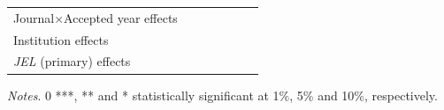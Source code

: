 \begin{table}
\begin{threeparttable}
\begin{tabular}{p{3.78cm}S@{}S@{}S@{}S@{}S@{}S@{}}
            Journal\(\times\)Accepted year effects &               &               &           {}   &               &               &           {}   \\
            Institution effects           &           {}   &           {}   &           {}   &           {}   &           {}   &           {}   \\
            \textit{JEL} (primary) effects&               &               &               &           {}   &           {}   &           {}   \\
            \bottomrule
        \end{tabular}
        \begin{tablenotes}
            \tiny
            \item \textit{Notes}. 0 ***, ** and * statistically significant at 1\%, 5\% and 10\%, respectively.
        \end{tablenotes}
    \end{threeparttable}
\end{table}